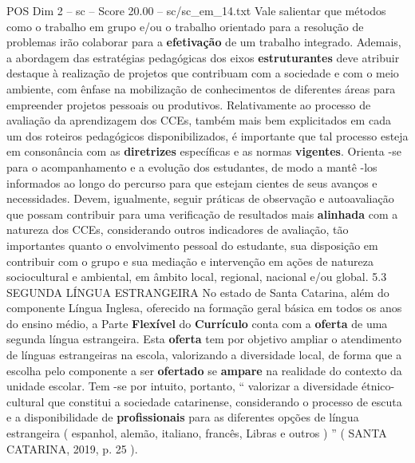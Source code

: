 \begin{textsample}{POS Dim 2 – sc – Score 20.00 – sc/sc\_em\_14.txt}
Vale salientar que métodos como o trabalho em grupo e/ou o trabalho orientado para a resolução de problemas irão colaborar para a \textbf{efetivação} de um trabalho integrado.
Ademais, a abordagem das estratégias pedagógicas dos eixos \textbf{estruturantes} deve atribuir destaque à realização de projetos que contribuam com a sociedade e com o meio ambiente, com ênfase na mobilização de conhecimentos de diferentes áreas para empreender projetos pessoais ou produtivos.
Relativamente ao processo de avaliação da aprendizagem dos CCEs, também mais bem explicitados em cada um dos roteiros pedagógicos disponibilizados, é importante que tal processo esteja em consonância com as \textbf{diretrizes} específicas e as normas \textbf{vigentes}.
Orienta -se para o acompanhamento e a evolução dos estudantes, de modo a mantê -los informados ao longo do percurso para que estejam cientes de seus avanços e necessidades.
Devem, igualmente, seguir práticas de observação e autoavaliação que possam contribuir para uma verificação de resultados mais \textbf{alinhada} com a natureza dos CCEs, considerando outros indicadores de avaliação, tão importantes quanto o envolvimento pessoal do estudante, sua disposição em contribuir com o grupo e sua mediação e intervenção em ações de natureza sociocultural e ambiental, em âmbito local, regional, nacional e/ou global. 5.3 SEGUNDA LÍNGUA ESTRANGEIRA No estado de Santa Catarina, além do componente Língua Inglesa, oferecido na formação geral básica em todos os anos do ensino médio, a Parte \textbf{Flexível} do \textbf{Currículo} conta com a \textbf{oferta} de uma segunda língua estrangeira.
Esta \textbf{oferta} tem por objetivo ampliar o atendimento de línguas estrangeiras na escola, valorizando a diversidade local, de forma que a escolha pelo componente a ser \textbf{ofertado} se \textbf{ampare} na realidade do contexto da unidade escolar.
Tem -se por intuito, portanto, “ valorizar a diversidade étnico-cultural que constitui a sociedade catarinense, considerando o processo de escuta e a disponibilidade de \textbf{profissionais} para as diferentes opções de língua estrangeira ( espanhol, alemão, italiano, francês, Libras e outros ) ” ( SANTA CATARINA, 2019, p. 25 ).

\end{textsample}
